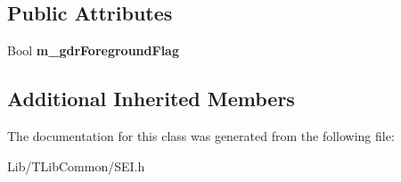 \subsection*{Public Attributes}
\begin{DoxyCompactItemize}
\item 
\mbox{\label{class_s_e_i_gradual_decoding_refresh_info_a14af0d7fa6e1abda0ce5b8df04f89e4f}} 
Bool {\bfseries m\+\_\+gdr\+Foreground\+Flag}
\end{DoxyCompactItemize}
\subsection*{Additional Inherited Members}


The documentation for this class was generated from the following file\+:\begin{DoxyCompactItemize}
\item 
Lib/\+T\+Lib\+Common/S\+E\+I.\+h\end{DoxyCompactItemize}
